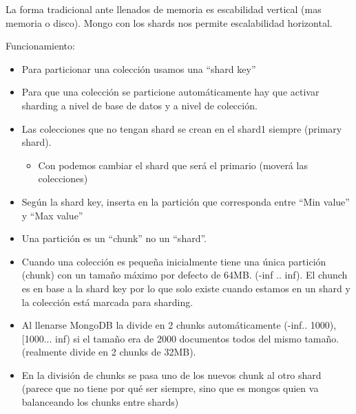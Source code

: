 \documentclass[a4paper,10pt,english]{sphinxmanual}
\begin{document}
La forma tradicional ante llenados de memoria es escabilidad vertical (mas memoria o disco). Mongo con los shards nos permite escalabilidad horizontal.

Funcionamiento:
\begin{itemize}
\item {} 
Para particionar una colección usamos una ``shard key''

\item {} 
Para que una colección se particione automáticamente hay que activar sharding a nivel de base de datos y a nivel de colección.

\item {} 
Las colecciones que no tengan shard se crean en el shard1 siempre (primary shard).
\begin{itemize}
\item {} 
Con  podemos cambiar el shard que será el primario (moverá las colecciones)

\end{itemize}

\item {} 
Según la shard key, inserta en la partición que corresponda entre ``Min value'' y ``Max value''

\item {} 
Una partición es un ``chunk'' no un ``shard''.

\item {} 
Cuando una colección es pequeña inicialmente tiene una única partición (chunk) con un tamaño máximo por defecto de 64MB. (-inf .. inf). El chunch es en base a la shard key por lo que solo existe cuando estamos en un shard y la colección está marcada para sharding.

\item {} 
Al llenarse MongoDB la divide en 2 chunks automáticamente (-inf.. 1000),{[}1000... inf) si el tamaño era de 2000 documentos todos del mismo tamaño. (realmente divide en 2 chunks de 32MB).

\item {} 
En la división de chunks se pasa uno de los nuevos chunk al otro shard (parece que no tiene por qué ser siempre, sino que es mongos quien va balanceando los chunks entre shards)

\end{itemize}
\end{document}
